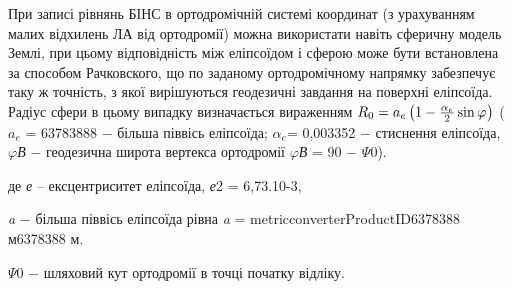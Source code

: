 При записі рівнянь БІНС в ортодромічній системі координат (з урахуванням малих відхилень 
ЛА від ортодромії) можна використати навіть сферичну модель Землі, при цьому відповідність 
між еліпсоїдом і сферою може бути встановлена за способом Рачковского, що по заданому 
ортодромічному напрямку забезпечує таку ж точність, з якої вирішуються геодезичні 
завдання на поверхні еліпсоїда. Радіус сфери в цьому випадку визначається вираженням $R_{0} 
=a_{e} \left(1-\frac{\alpha_{e} }{2} \sin {\rm \varphi }_{} \right)$ ($a_{e} $ = 
63783888 $-$ більша піввісь еліпсоїда; $\alpha_{e} $= 0,003352 $-$ стиснення еліпсоїда, $\varphi $\textit{В} $-$ геодезична 
широта вертекса ортодромії $\varphi $\textit{В  }= 90 $-$ $\Psi$0). 

де  \textit{е} -- ексцентриситет еліпсоїда, \textit{е}2\textit{ }= 6,73$.$10-3,     

\textit{a}  $-$ більша 
піввісь  еліпсоїда  рівна  \textit{a }=  metricconverterProductID6378388 м6378388 
м.

$\Psi$0 $-$ шляховий кут ортодромії в точці початку відліку.



